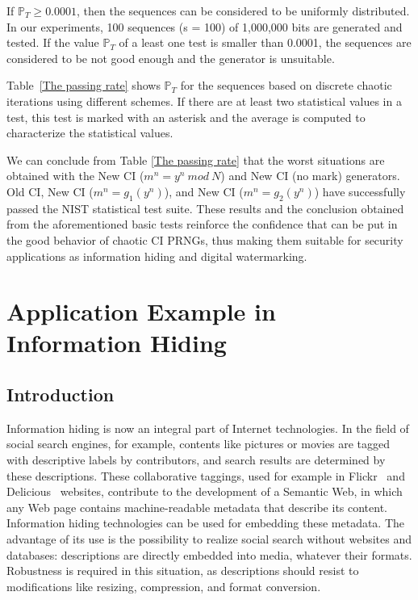 \documentclass[journal]{IEEEtran}
\begin{document}
If $\mathbb{P}_T \geq 0.0001$, then the sequences can be considered to be uniformly distributed.
In our experiments, 100 sequences (s = 100) of 1,000,000 bits are generated and tested. If the value $\mathbb{P}_T$ of a least one test is smaller than 0.0001, the sequences are considered to be not good enough and the generator is unsuitable.

Table~\ref{The passing rate} shows $\mathbb{P}_T$ for the sequences based on discrete chaotic iterations using different schemes. If there are at least two statistical values in a test, this test is marked with an asterisk and the average is computed to characterize the statistical values.

We can conclude from Table \ref{The passing rate} that the worst situations are obtained with the New CI ($m^n=y^n~mod~N$) and New CI (no mark) generators. Old CI, New CI ($m^n=g_1(y^n)$), and New CI ($m^n=g_2(y^n)$) have successfully passed the NIST statistical test suite. These results and the conclusion obtained from the aforementioned basic tests reinforce the confidence that can be put in the good behavior of chaotic CI PRNGs, thus making them suitable for security applications as information hiding and digital watermarking.



\section{Application Example in Information Hiding}
\label{An application example of the proposed PRNG}


\subsection{Introduction}

Information hiding is now an integral part of Internet technologies. In the field of social search engines, for example, contents like pictures or movies are tagged with descriptive labels by contributors, and search results are determined by these descriptions. These collaborative taggings, used for example in Flickr~\cite{Frick} and Delicious~\cite{Delicious} websites, contribute to the development of a Semantic Web, in which any Web page contains machine-readable metadata that describe its content. Information hiding technologies can be used for embedding these metadata. The advantage of its use is the possibility to realize  social search without websites and databases: descriptions are directly embedded into media, whatever their formats. Robustness is required in this situation, as descriptions should resist to modifications like resizing, compression, and format conversion.
\end{document}
